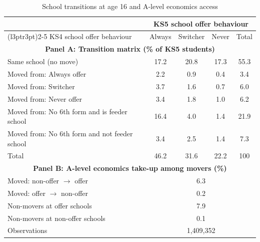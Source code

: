 \begin{table}[htbp]
\centering
\caption{School transitions at age 16 and A-level economics access}
\label{tab:school_moves}
\small
\begin{tabular}{l cccc}
\toprule
                                          & \multicolumn{4}{c}{KS5 school offer behaviour} \\
\cmidrule(l{3pt}r{3pt}){2-5}
KS4 school offer behaviour                & Always     & Switcher   & Never      & Total      \\
\midrule
\multicolumn{5}{c}{\textbf{Panel A: Transition matrix (\% of KS5 students)}} \\
\midrule
Same school (no move)                     & 17.2         & 20.8         & 17.3         & 55.3         \\
\addlinespace
Moved from: Always offer                  & 2.2        & 0.9         & 0.4         & 3.4         \\
Moved from: Switcher                      & 3.7         & 1.6        & 0.7         & 6.0         \\
Moved from: Never offer                   & 3.4         & 1.8         & 1.0        & 6.2         \\
Moved from: No 6th form and is feeder school                 & 16.4         & 4.0         & 1.4         & 21.9         \\
Moved from: No 6th form and not feeder school                 & 3.4         & 2.5         & 1.4         & 7.3         \\
\addlinespace
Total                                     & 46.2         & 31.6         & 22.2         & 100        \\
\midrule
\multicolumn{5}{c}{\textbf{Panel B: A-level economics take-up among movers (\%)}} \\
\midrule
Moved: non-offer $\rightarrow$ offer      & \multicolumn{4}{c}{6.3}                    \\
Moved: offer $\rightarrow$ non-offer      & \multicolumn{4}{c}{0.2}                    \\
Non-movers at offer schools               & \multicolumn{4}{c}{7.9}                    \\
Non-movers at non-offer schools           & \multicolumn{4}{c}{0.1}                    \\
\addlinespace
Observations                              & \multicolumn{4}{c}{1,409,352}                    \\

\end{tabular}
\end{table}
